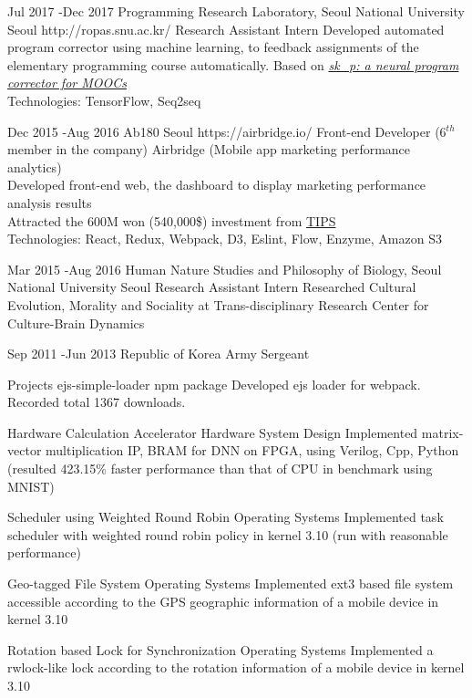 \documentclass[10pt]{article} %
\begin{document}
\job
{Jul 2017 -}{Dec 2017}
{Programming Research Laboratory, Seoul National University}
{Seoul}
{http://ropas.snu.ac.kr/}
{Research Assistant Intern}
{Developed automated program corrector using machine learning, to feedback assignments of the elementary programming course automatically. Based on \textit{\href{https://dl.acm.org/citation.cfm?id=2989222}{
sk\_p: a neural program corrector for MOOCs}}\\
Technologies: TensorFlow, Seq2seq}

\job
{Dec 2015 -}{Aug 2016}
{Ab180}
{Seoul}
{https://airbridge.io/}
{Front-end Developer (6$^{th}$ member in the company)}
{Airbridge (Mobile app marketing performance analytics)\\
Developed front-end web, the dashboard to display marketing performance analysis results\\
Attracted the 600M won (540,000\$) investment from \href{http://www.jointips.or.kr/}{TIPS}\\
Technologies: React, Redux, Webpack, D3, Eslint, Flow, Enzyme, Amazon S3}

\if{}
\job
{Mar 2015 -}{Aug 2016}
{Human Nature Studies and Philosophy of Biology, Seoul National University}
{Seoul}
{}
{Research Assistant Intern}
{Researched Cultural Evolution, Morality and Sociality at Trans-disciplinary Research Center for Culture-Brain Dynamics}

\jobnocontent
{Sep 2011 -}{Jun 2013}
{Republic of Korea Army}
{}
{}
{Sergeant}
\fi

\if{}
\project
{Projects}
{ejs-simple-loader}
{npm package}
{
Developed ejs loader for webpack. Recorded total 1367 downloads.}

\project
{}
{Hardware Calculation Accelerator}
{Hardware System Design}
{Implemented matrix-vector multiplication IP, BRAM for DNN on FPGA, using Verilog, Cpp, Python (resulted 423.15\% faster performance than that of CPU in benchmark using MNIST)}

\project
{}
{Scheduler using Weighted Round Robin}
{Operating Systems}
{Implemented task scheduler with weighted round robin policy in kernel 3.10 (run with reasonable performance)}

\project
{}
{Geo-tagged File System}
{Operating Systems}
{Implemented ext3 based file system accessible according to the GPS geographic information of a mobile device in kernel 3.10}

\project
{}
{Rotation based Lock for Synchronization}
{Operating Systems}
{Implemented a rwlock-like lock according to the rotation information of a mobile device in kernel 3.10}
\fi
\end{document}
